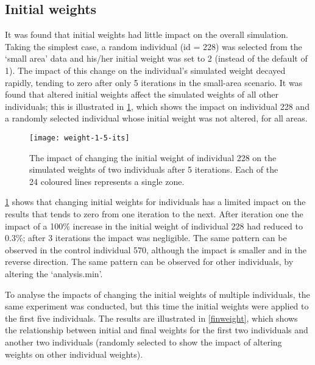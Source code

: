 \documentclass[a4paper,10pt]{article}
\providecommand{\DIFaddbeginFL}{} %
\providecommand{\DIFaddendFL}{} %
\providecommand{\DIFdelbeginFL}{} %
\providecommand{\DIFdelendFL}{} %
\begin{document}
\subsection{Initial weights}
It was found that initial weights had little impact on the overall simulation.
Taking the simplest case, a random individual (id = 228) was selected from the
`small area' data and his/her initial weight was set to 2
(instead of the default of 1). The impact of this change on the individual's
simulated weight decayed rapidly, tending to zero after only 5 iterations in the small-area scenario.
It was found that altered initial weights affect the simulated weights of all other individuals;
this is illustrated in \cref{ficweight}, which shows the impact on individual 228 and a randomly selected
individual whose initial weight was not altered, for all areas.

\begin{figure}
 \begin{center}
  \DIFdelbeginFL %
\DIFdelendFL \DIFaddbeginFL \texttt{[image: weight-1-5-its]}
 \DIFaddendFL \end{center}
\caption{The impact of changing the initial weight of individual 228 on the simulated weights of two individuals after 5 iterations. Each of the 24 coloured lines represents a single zone.}
\label{ficweight}
\end{figure}

\cref{ficweight} shows that changing initial weights
for individuals has a limited impact on the results that
 tends to zero from one iteration to the next.
After iteration one the impact of a 100\% increase in the initial weight
of individual 228 had reduced to 0.3\%; after 3 iterations the impact was negligible.
The same pattern can be observed in the control individual 570,
although the impact is smaller and in the reverse direction.
The same pattern can be observed for other individuals, by altering the `analysis.min'.

To analyse the impacts of changing the initial weights of multiple
individuals, the same experiment was conducted, but this time the initial weights were
applied to the first five individuals. The results are illustrated in \cref{finweight},
which shows the relationship between initial and final weights for the first two individuals
and another two individuals
(randomly selected to show the impact of altering weights on other individual weights).
\end{document}

